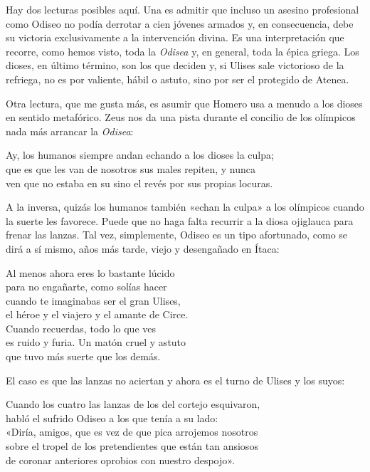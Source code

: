 Hay dos lecturas posibles aquí. Una es admitir que incluso un asesino profesional como Odiseo no podía derrotar a cien jóvenes armados y, en consecuencia, debe su victoria exclusivamente a la intervención divina. Es una interpretación que recorre, como hemos visto, toda la \emph{Odisea} y, en general, toda la épica griega. Los dioses, en último término, son los que deciden y, si Ulises sale victorioso de la refriega, no es por valiente, hábil o astuto, sino por ser el protegido de Atenea.

Otra lectura, que me gusta más, es asumir que Homero usa a menudo a los dioses en sentido metafórico. Zeus nos da una pista durante el concilio de los olímpicos nada más arrancar la \emph{Odisea}:

\begin{versocita}
Ay, los humanos siempre andan echando a los dioses la culpa;\\
que es que les van de nosotros sus males repiten, y nunca\\
ven que no estaba en su sino el revés por sus propias locuras.
\end{versocita}

A la inversa, quizás los humanos también «echan la culpa» a los olímpicos cuando la suerte les favorece. Puede que no haga falta recurrir a la diosa ojiglauca para frenar las lanzas. Tal vez, simplemente, Odiseo es un tipo afortunado, como se dirá a sí mismo, años más tarde, viejo y desengañado en Ítaca:

\begin{versopropio}
Al menos ahora eres lo bastante lúcido\\
para no engañarte, como solías hacer\\
cuando te imaginabas ser el gran Ulises,\\
el héroe y el viajero y el amante de Circe.\\
Cuando recuerdas, todo lo que ves\\
es ruido y furia. Un matón cruel y astuto\\
que tuvo más suerte que los demás.
\end{versopropio}

El caso es que las lanzas no aciertan y ahora es el turno de Ulises y los suyos:

\begin{versocita}
Cuando los cuatro las lanzas de los del cortejo esquivaron,\\
habló el sufrido Odiseo a los que tenía a su lado:\\
«Diría, amigos, que es vez de que pica arrojemos nosotros\\
sobre el tropel de los pretendientes que están tan ansiosos\\
de coronar anteriores oprobios con nuestro despojo».
\end{versocita}

